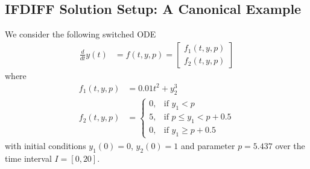 \subsection*{IFDIFF Solution Setup: A Canonical Example}
We consider the following switched ODE
\begin{align*}
	\frac{d}{dt}y(t) &= f(t,y,p) = 
	\begin{bmatrix} 
		f_1(t,y,p) \\
		f_2(t,y,p)
	\end{bmatrix}
\end{align*}
where
\begin{align*}
	f_1(t,y,p) &= 0.01 t^2 + y_2^3 \\
	f_2(t,y,p) &= \begin{cases} 
		0, & \text{if } y_1 < p \\ 5, & \text{if } p \leq y_1 < p + 0.5 \\ 0, &\text{if } y_1 \geq p + 0.5 \end{cases}
\end{align*}
with initial conditions $y_1(0) = 0$, $y_2(0) = 1$ and parameter $p = 5.437$ over the time interval $I = [0, 20]$.
